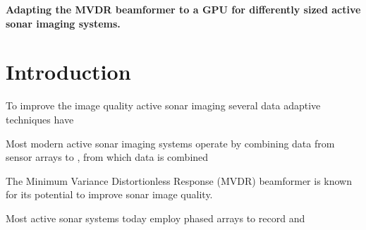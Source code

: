 \documentclass[
a4paper,10pt
]{common/ica2013_2}
\newcommand\1{\vec 1}
\begin{document}

\thispagestyle{empty}


{\Large\bf Adapting the MVDR beamformer to a GPU for differently sized active sonar imaging systems.}

\begin{abstract}
The MVDR beamformer has been shown to improve active sonar image quality compared to conventional methods. Unfortunately, it is also significantly more computationally expensive because a spatial covariance matrix must be estimated and inverted for each image pixel. We target this challenge by altering and mapping MVDR to a GPU, and suggest three different solutions depending on the system size.

For systems with relatively few channels, we suggest arithmetic optimizations for the estimation step, and show how a GPU can be used to yield image creation rates of more than 1\,Mpx/s. For larger systems we show that frequency domain processing is preferable. This promotes high processing rates at a negligible reduction in image quality. These GPU implementations consistently reduced the runtime by 2-3 orders of magnitude compared to our reference C and Matlab implementations.

For even larger systems we suggest employing the LCA beamformer. It does not calculate a weightset, but merely computes the beamformer output for each of a predefined set of weights, and selects the one that best fulfils the MVDR criterion. The LCA creates images with a quality comparable to MVDR, and it is perfectly suited for a GPU. 
\end{abstract}

\section{Introduction}

To improve the image quality active sonar imaging several data adaptive techniques have 

Most modern active sonar imaging systems operate by combining data from sensor arrays to , from which data is combined 

The Minimum Variance Distortionless Response (MVDR) beamformer is known for its potential to improve sonar image quality. 

Most active sonar systems today employ phased arrays to record and 
\end{document}
